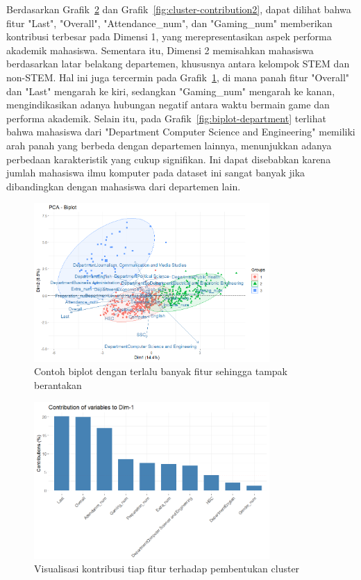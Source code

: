 Berdasarkan Grafik~\ref{fig:cluster-contribution1} dan Grafik~\ref{fig:cluster-contribution2}, dapat dilihat bahwa fitur "Last", "Overall", "Attendance\_num", dan "Gaming\_num" memberikan kontribusi terbesar pada Dimensi 1, yang merepresentasikan aspek performa akademik mahasiswa. Sementara itu, Dimensi 2 memisahkan mahasiswa berdasarkan latar belakang departemen, khususnya antara kelompok STEM dan non-STEM. Hal ini juga tercermin pada Grafik~\ref{fig:biplotcluttered}, di mana panah fitur "Overall" dan "Last" mengarah ke kiri, sedangkan "Gaming\_num" mengarah ke kanan, mengindikasikan adanya hubungan negatif antara waktu bermain game dan performa akademik. Selain itu, pada Grafik~\ref{fig:biplot-department} terlihat bahwa mahasiswa dari "Department Computer Science and Engineering" memiliki arah panah yang berbeda dengan departemen lainnya, menunjukkan adanya perbedaan karakteristik yang cukup signifikan. Ini dapat disebabkan karena jumlah mahasiswa ilmu komputer pada dataset ini sangat banyak jika dibandingkan dengan mahasiswa dari departemen lain.

\begin{figure}[!htpb]
    \centering
    \includegraphics[width=0.8\textwidth]{figures/biplotcluttered.png}
    \caption{Contoh biplot dengan terlalu banyak fitur sehingga tampak berantakan}\label{fig:biplotcluttered}
\end{figure}

\begin{figure}[!htpb]
    \centering
    \includegraphics[width=0.8\textwidth]{figures/Dim1.png}
    \caption{Visualisasi kontribusi tiap fitur terhadap pembentukan cluster}
    \label{fig:cluster-contribution1}
\end{figure}

